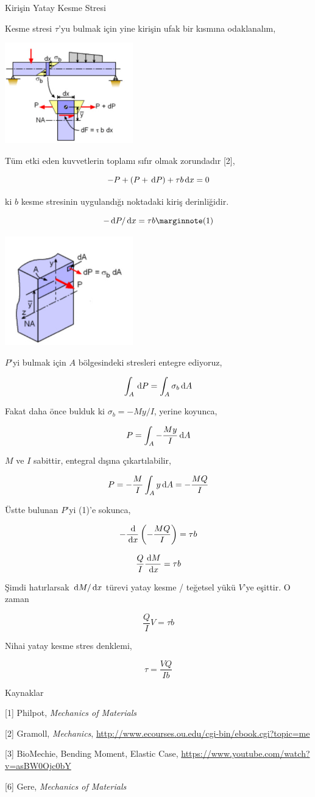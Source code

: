 \documentclass[12pt,fleqn]{article}\usepackage{../../common}
\begin{document}
Kirişin Yatay Kesme Stresi

Kesme stresi $\tau$'yu bulmak için yine kirişin ufak bir kısmına odaklanalım,

\includegraphics[width=15em]{phy_020_strs_01_05.jpg}

Tüm etki eden kuvvetlerin toplamı sıfır olmak zorundadır [2],

$$
-P + (P + \,\mathrm{d} P) + \tau b \,\mathrm{d} x = 0
$$

ki $b$ kesme stresinin uygulandığı noktadaki kiriş derinliğidir. 

$$
-\ud P/\ud x = \tau b
\mlabel{1}
$$

\includegraphics[width=15em]{phy_020_strs_00_01.jpg}

$P$'yi bulmak için $A$ bölgesindeki stresleri entegre ediyoruz,

$$
\int_A \,\mathrm{d} P = \int_A \sigma_b \,\mathrm{d} A
$$

Fakat daha önce bulduk ki $\sigma_b = -My / I$, yerine koyunca,

$$
P = \int_A - \frac{My}{I} \,\mathrm{d} A
$$

$M$ ve $I$ sabittir, entegral dışına çıkartılabilir,

$$
P = - \frac{M}{I} \int_A y \,\mathrm{d} A = - \frac{MQ}{I}
$$

Üstte bulunan $P$'yi (1)'e sokunca,

$$
- \frac{\,\mathrm{d}}{\,\mathrm{d} x} \left( - \frac{MQ}{I} \right) = \tau b
$$

$$
\frac{Q}{I} \frac{\,\mathrm{d} M}{\,\mathrm{d} x} = \tau b
$$

Şimdi hatırlarsak $\,\mathrm{d} M/\,\mathrm{d} x$ türevi yatay kesme / teğetsel yükü $V$'ye
eşittir. O zaman

$$
\frac{Q}{I} V = \tau b
$$

Nihai yatay kesme stres denklemi,

$$
\tau = \frac{V Q}{I b}
$$

Kaynaklar

[1] Philpot, {\em Mechanics of Materials}

[2] Gramoll, {\em Mechanics},
    \url{http://www.ecourses.ou.edu/cgi-bin/ebook.cgi?topic=me}

[3] BioMechie, {Bending Moment, Elastic Case},
    \url{https://www.youtube.com/watch?v=asBW0Ojc0bY}
    
[6] Gere, {\em Mechanics of Materials}
\end{document}

